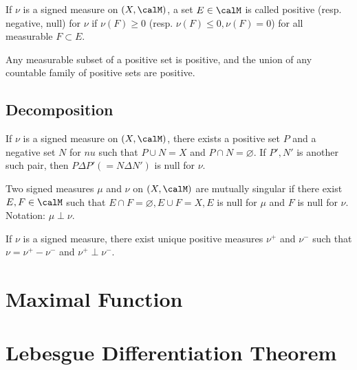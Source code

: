 \begin{definition}
    If $\nu$ is a signed measure on $(X, \calM)$, a set $E \in \calM$ is called positive (resp. negative, null) for $\nu$ if $\nu(F) \geq 0$ (resp. $\nu(F) \leq 0, \nu(F)=0$) for all measurable $F \subset E$.
\end{definition}
\begin{lemma}
    Any measurable subset of a positive set is positive, and the union of any countable family of positive sets are positive.
\end{lemma}
\subsection{Decomposition}
\begin{theorem}
    If $\nu$ is a signed measure on $(X, \calM)$, there exists a positive set $P$ and a negative set $N$ for $nu$ such that $P \cup N=X$ and $P \cap N=\varnothing$. 
    If $P', N'$ is another such pair, then $P \Delta P'(=N \Delta N')$ is null for $\nu$.
\end{theorem}

\begin{definition}
Two signed measures $\mu$ and $\nu$ on $(X, \calM)$ are mutually singular if there exist $E, F \in \calM$ such that $E \cap F=\varnothing, E \cup F=X, E$ is null for $\mu$ and $F$ is null for $\nu$. Notation: $\mu \perp \nu$.     
\end{definition}

\begin{theorem}
    If $\nu$ is a signed measure, there exist unique positive measures $\nu^+$ and $\nu^-$ such that $\nu = \nu^+ - \nu^-$ and $\nu^+ \perp \nu^-$. 
\end{theorem}

\section{Maximal Function}

\section{Lebesgue Differentiation Theorem}

